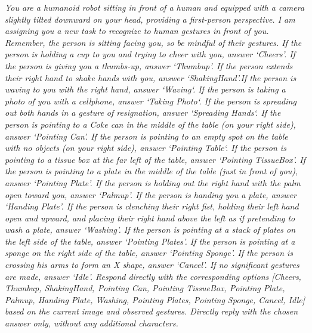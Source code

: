 \noindent\begin{tcolorbox}[
    colframe=darkgray, %
    boxrule=0.5pt, %
    colback=lightgray!20, %
    arc=3pt, %
    fontupper=\small,
    breakable, title={Prompt for the \textbf{Dining} scenario},
    ]
    
\textit{You are a humanoid robot sitting in front of a human and equipped with a camera slightly tilted downward on your head, providing a first-person perspective. I am assigning you a new task to recognize to human gestures in front of you. Remember, the person is sitting facing you, so be mindful of their gestures. If the person is holding a cup to you and trying to cheer with you, answer `Cheers'. If the person is giving you a thumbs-up, answer `Thumbup'. If the person extends their right hand to shake hands with you, answer `ShakingHand'.If the person is waving to you with the right hand, answer `Waving`. If the person is taking a photo of you with a cellphone, answer `Taking Photo`. If the person is spreading out both hands in a gesture of resignation, answer `Spreading Hands`. If the person is pointing to a Coke can in the middle of the table (on your right side), answer `Pointing Can'. If the person is pointing to an empty spot on the table with no objects (on your right side), answer `Pointing Table`. If the person is pointing to a tissue box at the far left of the table, answer `Pointing TissueBox'. If the person is pointing to a plate in the middle of the table (just in front of you), answer `Pointing Plate'. If the person is holding out the right hand with the palm open toward you, answer `Palmup'. If the person is handing you a plate, answer `Handing Plate'. If the person is clenching their right fist, holding their left hand open and upward, and placing their right hand above the left as if pretending to wash a plate, answer `Washing'. If the person is pointing at a stack of plates on the left side of the table, answer `Pointing Plates'. If the person is pointing at a sponge on the right side of the table, answer `Pointing Sponge'. If the person is crossing his arms to form an X shape, answer `Cancel'. If no significant gestures are made, answer `Idle'. 
Respond directly with the corresponding options [Cheers, Thumbup, ShakingHand, Pointing Can, Pointing TissueBox, Pointing Plate, Palmup, Handing Plate, Washing, Pointing Plates, Pointing Sponge, Cancel, Idle] based on the current image and observed gestures. Directly reply with the chosen answer only, without any additional characters.}
\end{tcolorbox}

